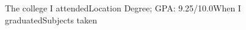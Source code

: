 \resumeEduSubHeading
    {The college I attended}{Location}
    {Degree; GPA: 9.25/10.0}{When I graduated}{Subjects taken}